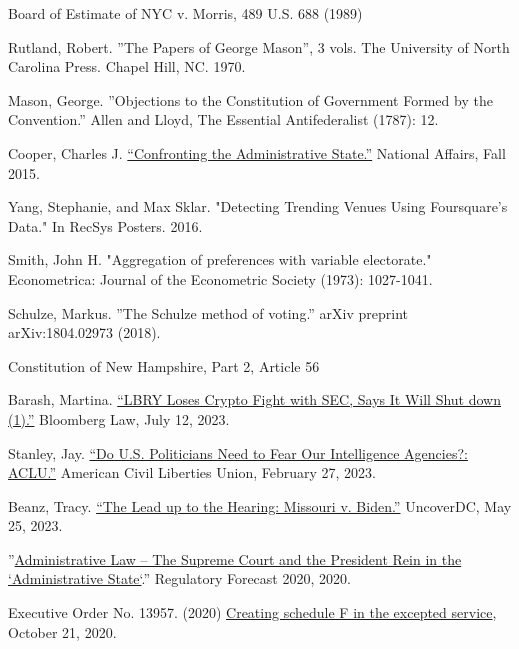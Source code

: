 \documentclass{article}
\begin{document}
\begin{thebibliography}{20}
Board of Estimate of NYC v. Morris, 489 U.S. 688 (1989)

Rutland, Robert. ”The Papers of George Mason”, 3 vols. The University of North Carolina Press. Chapel Hill, NC. 1970.

Mason, George. ”Objections to the Constitution of Government Formed by the Convention.” Allen and Lloyd, The Essential Antifederalist (1787): 12.

Cooper, Charles J. \href{https://www.nationalaffairs.com/publications/detail/confronting-the-administrative-state}{“Confronting the Administrative State.”} National Affairs, Fall 2015.

Yang, Stephanie, and Max Sklar. "Detecting Trending Venues Using Foursquare's Data." In RecSys Posters. 2016.

Smith, John H. "Aggregation of preferences with variable electorate." Econometrica: Journal of the Econometric Society (1973): 1027-1041.

Schulze, Markus. ”The Schulze method of voting.” arXiv preprint arXiv:1804.02973 (2018).

Constitution of New Hampshire, Part 2, Article 56

Barash, Martina. \href{https://news.bloomberglaw.com/ip-law/lbry-loses-crypto-token-fight-with-sec-but-vows-it-wont-appeal}{“LBRY Loses Crypto Fight with SEC, Says It Will Shut down (1).”} Bloomberg Law, July 12, 2023.

Stanley, Jay. \href{https://www.aclu.org/news/national-security/do-us-politicians-need-fear-our-intelligence}{“Do U.S. Politicians Need to Fear Our Intelligence Agencies?: ACLU.”} American Civil Liberties Union, February 27, 2023.

Beanz, Tracy. \href{https://www.uncoverdc.com/2023/05/24/the-lead-up-to-the-hearing-missouri-v-biden/}{“The Lead up to the Hearing: Missouri v. Biden.”} UncoverDC, May 25, 2023. 

”\href{https://www.crowell.com/a/web/bomv5ATK9LZPNrBA51skWq/4TtiyY/Regulatory-Forecast-2020-Administrative-Law-Crowell-Moring.pdf }{Administrative Law – The Supreme Court and the President Rein in the `Administrative State`}.” Regulatory Forecast 2020, 2020. 

Executive Order No. 13957. (2020) \href{https://www.
federalregister.gov/documents/2020/10/26/2020-23780/creating-schedule-f-in-the-excepted-service}{Creating schedule F in the excepted service}, October 21, 2020.


\end{thebibliography}
\end{document}
